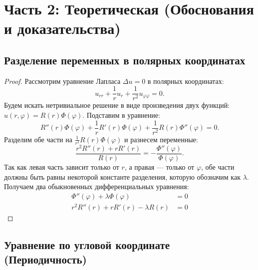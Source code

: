 \documentclass[a4paper,10pt]{article}
\begin{document}
\newpage
\section{Часть 2: Теоретическая (Обоснования и доказательства)}

\subsection*{Разделение переменных в полярных координатах}

\begin{proof}
Рассмотрим уравнение Лапласа $\Delta u = 0$ в полярных координатах:
\[ u_{rr} + \frac{1}{r}u_r + \frac{1}{r^2}u_{\varphi\varphi} = 0. \]
Будем искать нетривиальное решение в виде произведения двух функций: $u(r, \varphi) = R(r)\Phi(\varphi)$. Подставим в уравнение:
\[ R''(r)\Phi(\varphi) + \frac{1}{r}R'(r)\Phi(\varphi) + \frac{1}{r^2}R(r)\Phi''(\varphi) = 0. \]
Разделим обе части на $\frac{1}{r^2}R(r)\Phi(\varphi)$ и разнесем переменные:
\[ \frac{r^2 R''(r) + r R'(r)}{R(r)} = -\frac{\Phi''(\varphi)}{\Phi(\varphi)}. \]
Так как левая часть зависит только от $r$, а правая — только от $\varphi$, обе части должны быть равны некоторой константе разделения, которую обозначим как $\lambda$. Получаем два обыкновенных дифференциальных уравнения:
\begin{align}
    \Phi''(\varphi) + \lambda \Phi(\varphi) &= 0 \label{eq:phi} \\
    r^2 R''(r) + r R'(r) - \lambda R(r) &= 0 \label{eq:R}
\end{align}
\end{proof}

\subsection*{Уравнение по угловой координате (Периодичность)}
\end{document}
